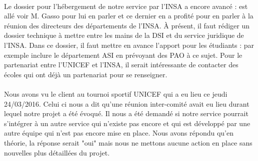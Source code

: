 \documentclass [a4paper] {article}
\begin{document}
\paragraph*{}
Le dossier pour l’hébergement de notre service par l'INSA a encore avancé : \Sergi est allé voir M. Gasso pour lui en parler et ce dernier en a profité pour en parler à la réunion des directeurs des départements de l'INSA. À présent, il faut rédiger un dossier technique à mettre entre les mains de la DSI et du service juridique de l'INSA. Dans ce dossier, il faut mettre en avance l'apport pour les étudiants : par exemple inclure le département ASI en prévoyant des PAO à ce sujet. Pour le partenariat entre l'UNICEF et l'INSA, il serait intéressante de contacter des écoles qui ont déjà un partenariat pour se renseigner.

\paragraph*{}
Nous avons vu le client au tournoi sportif UNICEF qui a eu lieu ce jeudi 24/03/2016. Celui ci nous a dit qu'une réunion inter-comité avait eu lieu durant lequel notre projet a été évoqué. Il nous a été demandé si notre service pourrait s'intégrer à un autre service qui n'existe pas encore et qui est développé par une autre équipe qui n'est pas encore mise en place. Nous avons répondu qu'en théorie, la réponse serait "oui" mais nous ne mettons aucune action en place sans nouvelles plus détaillées du projet.





\newpage
\end{document}
